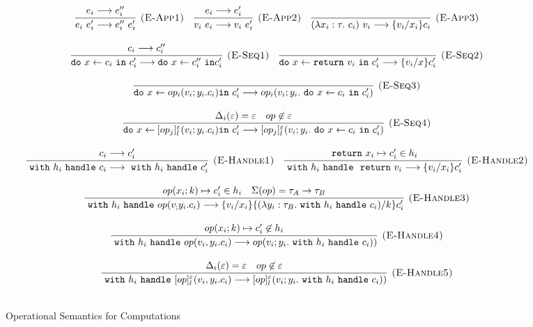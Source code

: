 \begin{figure}[p]
{\[\begin{array}{c}
\infer[\textsc{(E-App1)}]
  {e_i\ e_i' \longrightarrow e_i''\ e_i'}
  {e_i \longrightarrow e_i''}  \quad
  
\infer[\textsc{(E-App2)}]
  {v_i \ e_i \longrightarrow v_i\ e_i'}
  {e_i\longrightarrow e_i'}  \quad
  
\infer[\textsc{(E-App3)}]
  {(\lambda x_i:\tau.\ c_i) \ v_i \longrightarrow \{v_i/x_i\}c_i}
  {} \\[3ex]
  
  
\infer[\textsc{(E-Seq1)}]
  {\texttt{do}\ x \leftarrow c_i\ \texttt{in}\ c_i' \longrightarrow \texttt{do}\ x \leftarrow c_i''\ \texttt{in} c_i'}
  {c_i \longrightarrow c_i''}  \quad
  
\infer[\textsc{(E-Seq2)}]
  {\texttt{do}\ x \leftarrow \texttt{return}\ v_i \ \texttt{in}\ c_i' \longrightarrow \{v_i/x\} c_i'}
  {} \\[3ex]
  
\infer[\textsc{(E-Seq3)}]
  {\texttt{do}\ x \leftarrow op_i(v_i; y_i.c_i) \texttt{in}\ c_i' \longrightarrow op_i(v_i; y_i. \m{do} x \leftarrow c_i \m{in} c_i')}
  {} \\[3ex]
  
\infer[\textsc{(E-Seq4)}]
  {\texttt{do}\ x \leftarrow [op_j]^\varepsilon_l(v_i; y_i.c_i) \texttt{in}\ c_i' \longrightarrow [op_j]^\varepsilon_l(v_i; y_i. \m{do} x \leftarrow c_i \m{in} c_i')}
  {\Delta_i(\varepsilon) = \varepsilon & op \not \in \varepsilon} \\[3ex]
  

  
 \infer[\textsc{(E-Handle1)}]
  {\m{with} h_i \m{handle} c_i \longrightarrow \m{with} h_i \m{handle} c_i' }
  {c_i \longrightarrow c_i'} \quad
  
\infer[\textsc{(E-Handle2)}]
  {\m{with} h_i \m{handle} \m{return} v_i \longrightarrow \{v_i/x_i\}c_i' }
  {\m{return} x_i \mapsto	c_i' \in h_i} \\[3ex]
  
\infer[\textsc{(E-Handle3)}]
  {\m{with} h_i \m{handle} op(v_; y_i.c_i) \longrightarrow \{v_i/x_i\} \{(\lambda y_i: \tau_B.
   \m{with} h_i\m{handle} c_i) / k\}c_i' }
  {op(x_i; k) \mapsto c_i' \in h_i & \Sigma(op) = \tau_A \rightarrow \tau_B} \\[3ex]
 
 
\infer[\textsc{(E-Handle4)}]
  {\m{with} h_i \m{handle} op(v_i, y_i.c_i) \longrightarrow op(v_i; y_i. \m{with} h_i \m{handle} c_i))}
  {op(x_i; k) \mapsto c_i' \not\in h_i } \\[3ex]
  
\infer[\textsc{(E-Handle5)}]
  {\m{with} h_i \m{handle} [op]^\varepsilon_l(v_i, y_i.c_i) \longrightarrow [op]^\varepsilon_l(v_i; y_i. \m{with} h_i \m{handle} c_i))}
  {\Delta_i(\varepsilon) = \varepsilon & op \not \in \varepsilon} \\[3ex]
  


\end{array}
\]

}
\caption{Operational Semantics for Computations}
\label{fig-op2}

\end{figure}

